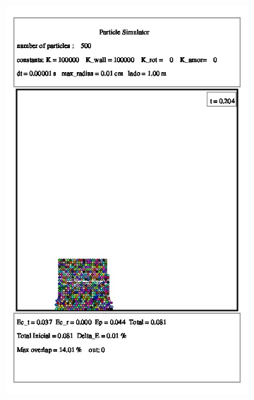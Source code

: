 \documentclass[a4paper,11pt]{article}
\begin{document}
\begin{figure}[!hto]
\begin{subfigure}{0.5\textwidth}
		\includegraphics[scale=0.4]{./images/time_1.jpeg}
		\caption{}
	\end{subfigure}
	

\end{figure}
\end{document}
